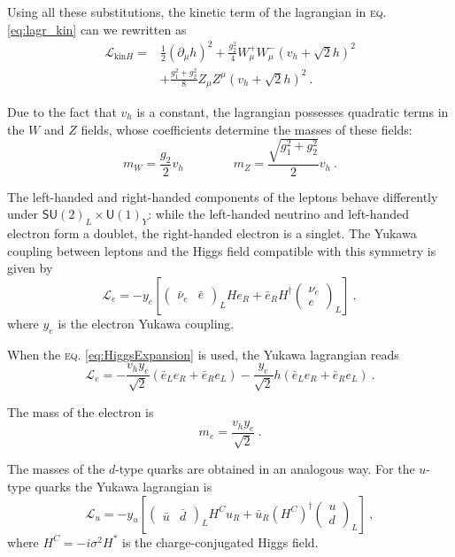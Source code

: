 \documentclass[aps,prd,preprintnumbers,nofootinbibn,twocolumn]{revtex4}
\begin{document}
Using all these substitutions, the kinetic term of the lagrangian in \textsc{eq.} \eqref{eq:lagr_kin} can we rewritten as
\begin{align}
\mathcal{L}_{\mathrm{kin}H} =& \frac{1}{2}(\partial_\mu h)^2 + \frac{g_2^2}{4} W_\mu^+ W_\mu^- (v_h + \sqrt{2}h)^2 \nonumber\\
&+ \frac{g_1^2 + g_2^2}{8}Z_\mu Z^\mu (v_h + \sqrt{2}h)^2\ . \label{eq:WZmassterm}
\end{align}

Due to the fact that $v_h$ is a constant, the lagrangian possesses quadratic terms in the $W$ and $Z$ fields, whose coefficients determine the masses of these fields:
\begin{equation}
m_W= \frac{g_2}{2} v_h \qquad\qquad m_Z = \frac{\sqrt{g_1^2 + g_2^2}}{2}v_h\ .
\end{equation}

The left-handed and right-handed components of the leptons behave differently under $\mathsf{SU}(2)_L \times \mathsf{U}(1)_Y$: while the left-handed neutrino and left-handed electron form a doublet, the right-handed electron is a singlet. The Yukawa coupling between leptons and the Higgs field compatible with this symmetry is given by
\begin{equation}
\mathcal{L}_e = - y_e \left[ \begin{pmatrix}\bar{\nu}_e & \bar{e} \end{pmatrix}_L H e_R + \bar{e}_R H^\dagger \begin{pmatrix}\nu_e\\ e\end{pmatrix}_L \right]\ , \label{eq:yukawae}
\end{equation}
where $y_e$ is the electron Yukawa coupling.

When the \textsc{eq.} \eqref{eq:HiggsExpansion} is used, the Yukawa lagrangian reads
\begin{equation}
\mathcal{L}_e = -\frac{v_h y_e}{\sqrt{2}} (\bar{e}_L e_R + \bar{e}_R e_L)- \frac{y_e}{\sqrt{2}} h (\bar{e}_L e_R + \bar{e}_R e_L) \ .
\end{equation}


The mass of the electron is
\begin{equation}
m_e = \frac{v_h y_e}{\sqrt{2}}\ .
\end{equation} 

The masses of the $d$-type quarks are obtained in an analogous way. For the $u$-type quarks the Yukawa lagrangian is 
\begin{equation}
\mathcal{L}_u = -y_u \left[ \begin{pmatrix}\bar{u} & \bar{d} \end{pmatrix}_L H^C u_R + \bar{u}_R (H^C)^\dagger \begin{pmatrix}u\\ d\end{pmatrix}_L \right]\ ,
\end{equation}
where $H^C = -i\sigma^2 H^*$ is the charge-conjugated Higgs field.
\end{document}
